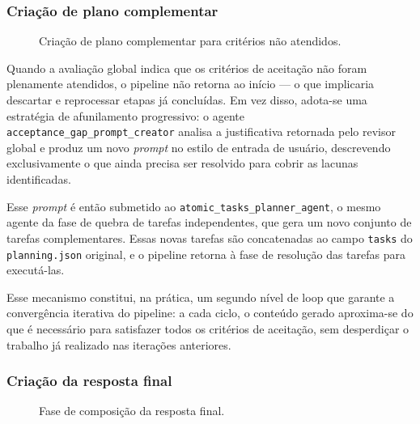 \documentclass[a4paper,10pt,twocolumn]{article}
\begin{document}
\subsubsection{Criação de plano complementar}

\begin{figure}[H]
  \centering
  
  \caption{Criação de plano complementar para critérios não atendidos.}
  \label{fig:plano_complementar}
\end{figure}

Quando a avaliação global indica que os critérios de aceitação não foram plenamente atendidos, o pipeline não retorna ao início — o que implicaria descartar e reprocessar etapas já concluídas. Em vez disso, adota-se uma estratégia de afunilamento progressivo: o agente \texttt{acceptance\_gap\_prompt\_creator} analisa a justificativa retornada pelo revisor global e produz um novo \textit{prompt} no estilo de entrada de usuário, descrevendo exclusivamente o que ainda precisa ser resolvido para cobrir as lacunas identificadas.

Esse \textit{prompt} é então submetido ao \texttt{atomic\_tasks\_planner\_agent}, o mesmo agente da fase de quebra de tarefas independentes, que gera um novo conjunto de tarefas complementares. Essas novas tarefas são concatenadas ao campo \texttt{tasks} do \texttt{planning.json} original, e o pipeline retorna à fase de resolução das tarefas para executá-las.

Esse mecanismo constitui, na prática, um segundo nível de loop que garante a convergência iterativa do pipeline: a cada ciclo, o conteúdo gerado aproxima-se do que é necessário para satisfazer todos os critérios de aceitação, sem desperdiçar o trabalho já realizado nas iterações anteriores.

\subsubsection{Criação da resposta final}

\begin{figure}[H]
  \centering
  
  \caption{Fase de composição da resposta final.}
  \label{fig:resposta_final}
\end{figure}
\end{document}
